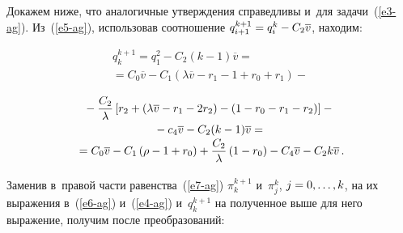 \begin{multicols}{2}
  Докажем ниже, что аналогичные утверждения справедливы и~для 
задачи~(\ref{e3-ag}). Из~(\ref{e5-ag}), использовав соотношение 
$q_{i+1}^{k+1}\hm= q_i^k\hm-C_2\overline{v}$, находим:

\noindent
  \begin{multline*}
  q_k^{k+1}=q_1^2 -C_2(k-1)\overline{v} ={}\\[-1pt]
  {}=C_0\overline{v}-
C_1\left(\lambda\overline{v}-r_1-1+r_0+r_1\right)-{}
\end{multline*}

\pagebreak

\noindent
\begin{multline*}
  \!{}-\displaystyle\frac{\displaystyle C_2\mathstrut}{\displaystyle \lambda\mathstrut}\left[ r_2+\left( \lambda\overline{v}-r_1-2r_2\right) -\left(1-
r_0 -r_1-r_2\right)\right]-{}\\[-3pt]
{}-c_4\overline{v}-C_2(k-1)\overline{v}={}\\[-3pt]
  {}= C_0\overline{v}-C_1\left( \rho-1+r_0\right) +\displaystyle\frac{\displaystyle C_2\mathstrut}{\displaystyle \lambda\mathstrut}\left( 1-
r_0\right) -C_4\overline{v}-C_2 k\overline{v}\,.
  \end{multline*}
  
  Заменив в~правой части равенства~(\ref{e7-ag}) $\pi_k^{k+1}$ и~$\pi_j^k$, 
$j\hm=0,\ldots, k$, на их выражения в~(\ref{e6-ag}) и~(\ref{e4-ag}) 
и~$q_k^{k+1}$ на полученное выше для него выражение, получим после 
преобразований:


\end{multicols}
